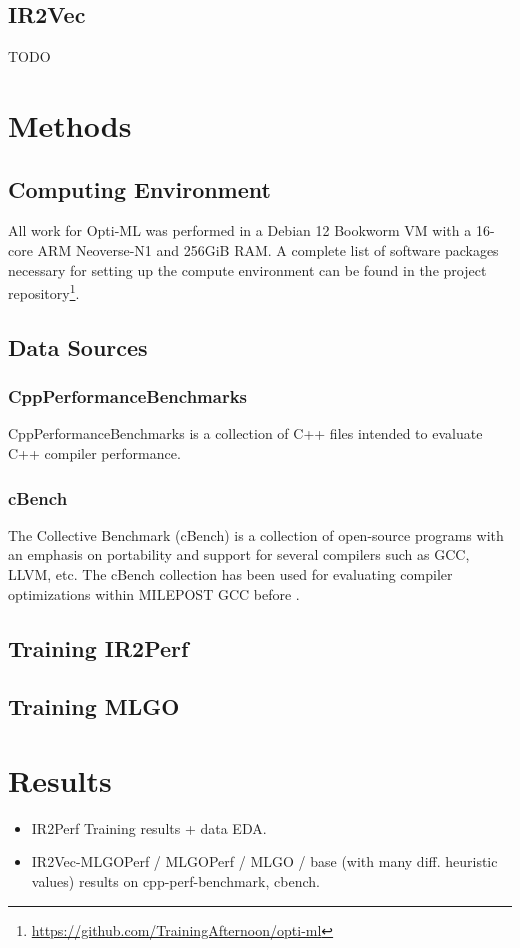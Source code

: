 \documentclass[nohyperref]{article}
\theoremstyle{plain}
\theoremstyle{definition}
\theoremstyle{remark}
\begin{document}
\subsection{IR2Vec}
TODO

\section{Methods}
\label{methods}
\subsection{Computing Environment}
All work for Opti-ML was performed in a Debian 12 Bookworm VM with a 16-core ARM Neoverse-N1 and 256GiB RAM. A complete list of software packages necessary for setting up the compute environment can be found in the project repository\footnote{\href{https://github.com/TrainingAfternoon/opti-ml}{https://github.com/TrainingAfternoon/opti-ml}}.

\subsection{Data Sources}
\subsubsection{CppPerformanceBenchmarks}
CppPerformanceBenchmarks is a collection of C++ files intended to evaluate C++ compiler performance.

\subsubsection{cBench}
The Collective Benchmark (cBench) is a collection of open-source programs with an emphasis on portability and support for several compilers such as GCC, LLVM, etc. The cBench collection has been used for evaluating compiler optimizations within MILEPOST GCC before \cite{cbench}.

\subsection{Training IR2Perf}

\subsection{Training MLGO}

\section{Results}
\label{results}
\begin{itemize}
\item IR2Perf Training results + data EDA\@.
\item IR2Vec-MLGOPerf / MLGOPerf / MLGO / base (with many diff. heuristic values) results on cpp-perf-benchmark, cbench\@.
\end{itemize}
\end{document}
